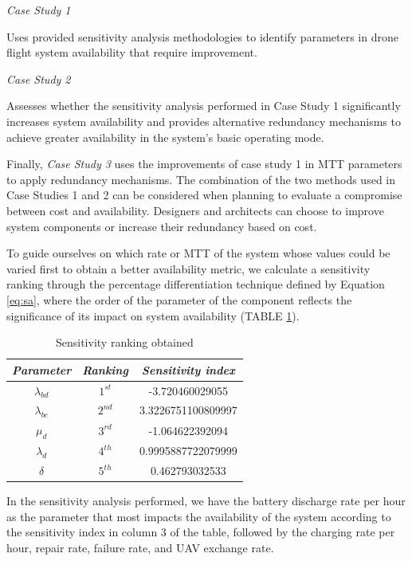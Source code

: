 \documentclass[conference]{IEEEtran}
\begin{document}
\textit{Case Study 1} 

Uses provided sensitivity analysis methodologies to identify parameters in drone flight system availability that require improvement.

\textit{Case Study 2} 

Assesses whether the sensitivity analysis performed in Case Study 1 significantly increases system availability and provides alternative redundancy mechanisms to achieve greater availability in the system's basic operating mode.

Finally, \textit{Case Study 3} uses the improvements of case study 1 in MTT parameters to apply redundancy mechanisms. The combination of the two methods used in Case Studies 1 and 2 can be considered when planning to evaluate a compromise between cost and availability. Designers and architects can choose to improve system components or increase their redundancy based on cost.

To guide ourselves on which rate or MTT of the system whose values could be varied first to obtain a better availability metric, we calculate a sensitivity ranking through the percentage differentiation technique defined by Equation \ref{eq:sa}, where the order of the parameter of the component reflects the significance of its impact on system availability (TABLE \ref{tab:sa_rank}).

\begin{table}[htbp]
\caption{Sensitivity ranking obtained}
\begin{center}
\begin{tabular}{|c|c|c|}
\hline
\textbf{\textit{Parameter}}& \textbf{\textit{Ranking}} & \textbf{\textit{Sensitivity index}} \\
\hline
\(\lambda_{bd}\) & \(1^{st}\) & -3.720460029055 \\
\(\lambda_{bc}\) & \(2^{nd}\) & 3.3226751100809997 \\
 \(\mu_{d}\) & \(3^{rd}\) & -1.064622392094 \\
\(\lambda_{d}\) & \(4^{th}\) & 0.9995887722079999 \\
\(\delta\) & \(5^{th}\) & 0.462793032533 \\
\hline
\end{tabular}
\label{tab:sa_rank}
\end{center}
\end{table}

In the sensitivity analysis performed, we have the battery discharge rate per hour as the parameter that most impacts the availability of the system according to the sensitivity index in column 3 of the table, followed by the charging rate per hour, repair rate, failure rate, and UAV exchange rate.
\end{document}
